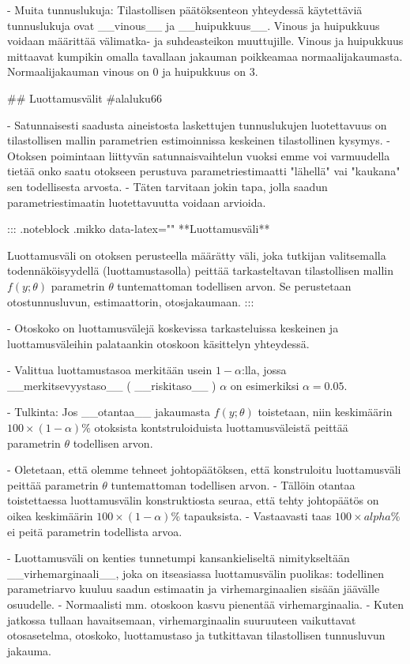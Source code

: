 \documentclass[
]{book}
\begin{document}
\begin{itemize}
- Muita tunnuslukuja: Tilastollisen päätöksenteon yhteydessä käytettäviä tunnuslukuja ovat __vinous__ ja __huipukkuus__. Vinous ja huipukkuus voidaan määrittää välimatka- ja suhdeasteikon muuttujille. Vinous ja huipukkuus mittaavat kumpikin omalla tavallaan jakauman poikkeamaa normaalijakaumasta. Normaalijakauman vinous on 0 ja huipukkuus on 3.

## Luottamusvälit {#alaluku66}

- Satunnaisesti saadusta aineistosta laskettujen tunnuslukujen luotettavuus on tilastollisen mallin parametrien estimoinnissa keskeinen tilastollinen kysymys. 
  - Otoksen poimintaan liittyvän satunnaisvaihtelun vuoksi emme voi varmuudella tietää onko saatu otokseen perustuva parametriestimaatti "lähellä" vai "kaukana" sen todellisesta arvosta.
  - Täten tarvitaan jokin tapa, jolla saadun parametriestimaatin luotettavuutta voidaan arvioida.

::: {.noteblock .mikko data-latex="{}"}
**Luottamusväli**  

Luottamusväli on otoksen perusteella määrätty väli, joka tutkijan valitsemalla todennäköisyydellä (luottamustasolla) peittää tarkasteltavan tilastollisen mallin $f(y;\theta)$ parametrin $\theta$ tuntemattoman todellisen arvon. Se perustetaan otostunnusluvun, estimaattorin, otosjakaumaan. 
:::

- Otoskoko on luottamusvälejä koskevissa tarkasteluissa keskeinen ja luottamusväleihin palataankin otoskoon käsittelyn yhteydessä.

- Valittua luottamustasoa merkitään usein $1-\alpha$:lla, jossa __merkitsevyystaso__ ( __riskitaso__ ) $\alpha$ on esimerkiksi $\alpha=0.05$.

- Tulkinta: Jos __otantaa__ jakaumasta $f(y;\theta)$ toistetaan, niin keskimäärin $100 \times (1-\alpha)\%$ otoksista kontstruloiduista luottamusväleistä peittää parametrin $\theta$ todellisen arvon.

- Oletetaan, että olemme tehneet johtopäätöksen, että konstruloitu luottamusväli peittää parametrin $\theta$ tuntemattoman todellisen arvon. 
  - Tällöin otantaa toistettaessa luottamusvälin konstruktiosta seuraa, että tehty johtopäätös on oikea keskimäärin $100 \times (1-\alpha)\%$ tapauksista.
  - Vastaavasti taas $100 \times alpha \%$ ei peitä parametrin todellista arvoa.

- Luottamusväli on kenties tunnetumpi kansankieliseltä nimitykseltään __virhemarginaali__, joka on itseasiassa luottamusvälin puolikas: todellinen parametriarvo kuuluu saadun estimaatin ja virhemarginaalien sisään jäävälle osuudelle. 
  - Normaalisti mm. otoskoon kasvu pienentää virhemarginaalia.
  - Kuten jatkossa tullaan havaitsemaan, virhemarginaalin suuruuteen vaikuttavat otosasetelma, otoskoko, luottamustaso ja tutkittavan tilastollisen tunnusluvun jakauma.


\end{itemize}
\end{document}
